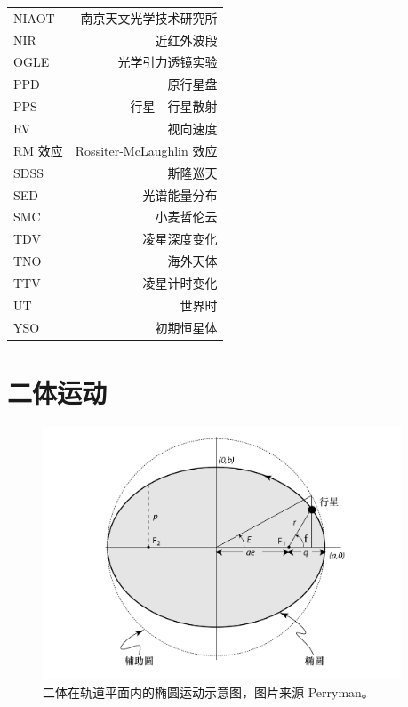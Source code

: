 \begin{multicols}{2}
\begin{tabularx}{0.85\linewidth}{@{\extracolsep{\fill}}lr}
NIAOT		&   南京天文光学技术研究所	\\
NIR			&    近红外波段				\\
OGLE		&    光学引力透镜实验		\\
PPD			&    原行星盘				\\
PPS			&    行星---行星散射			\\
RV			&    视向速度				\\
RM 效应		&    Rossiter-McLaughlin 效应	\\
SDSS		&    斯隆巡天				\\
SED			&    光谱能量分布			\\
SMC			&    小麦哲伦云				\\
TDV			&    凌星深度变化			\\
TNO			&    海外天体				\\
TTV			&    凌星计时变化			\\
UT			&    世界时				\\
YSO			&    初期恒星体				\\


\end{tabularx}
\end{multicols}




\chapter{二体运动} \label{apdx:twobodyproblem}

\begin{figure}[h]
\centering
\includegraphics[width=0.95\textwidth]{figures/appendix/f1_ellipse.pdf}
\caption{二体在轨道平面内的椭圆运动示意图，图片来源 Perryman。}
\label{fig:ellipse}
\end{figure}

